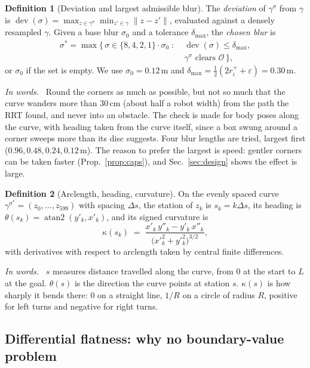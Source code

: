 \documentclass[conference]{IEEEtran}
\theoremstyle{plain}
\theoremstyle{definition}
\newtheorem{definition}{Definition}
\newcommand{\inwords}{\par\smallskip\noindent\textit{In words.}\ }
\newcommand{\Obs}{\mathcal{O}}
\newcommand{\clr}{\varepsilon}
\begin{document}
\begin{definition}[Deviation and largest admissible blur]
\label{def:fitblur}
The \emph{deviation} of $\gamma^{\sigma}$ from $\gamma$ is
$\operatorname{dev}(\sigma) = \max_{z \in \gamma^{\sigma}} \min_{z' \in \gamma}
\lVert z - z'\rVert$, evaluated against a densely resampled $\gamma$. Given a base blur
$\sigma_0$ and a tolerance $\delta_{\max}$, the \emph{chosen blur} is
\begin{equation}
\begin{aligned}
  \sigma^\ast = \max\big\{\, \sigma \in \{8,4,2,1\}\cdot\sigma_0 \;:\;
    &\operatorname{dev}(\sigma) \le \delta_{\max},\\
    &\gamma^{\sigma} \text{ clears } \Obs \,\big\},
\end{aligned}
  \label{eq:fitblur}
\end{equation}
or $\sigma_0$ if the set is empty. We use $\sigma_0 = 0.12$\,m and
$\delta_{\max} = \tfrac12(2r^{+}_i + \clr) = 0.30$\,m.
\inwords
Round the corners as much as possible, but not so much that the curve wanders more than
$30$\,cm (about half a robot width) from the path the RRT found, and never into an obstacle.
The check is made for body poses along the curve, with heading taken from the curve itself,
since a box swung around a corner sweeps more than its disc suggests. Four blur lengths are
tried, largest first ($0.96, 0.48, 0.24, 0.12$\,m). The reason to prefer the largest is
speed: gentler corners can be taken faster (Prop.~\ref{prop:caps}), and
Sec.~\ref{sec:design} shows the effect is large.
\end{definition}

\begin{definition}[Arclength, heading, curvature]
On the evenly spaced curve $\gamma^{\sigma^\ast} = (z_0,\dots,z_{599})$ with spacing
$\Delta s$, the station of $z_k$ is $s_k = k\Delta s$, its heading is
$\theta(s_k) = \operatorname{atan2}(y'_k, x'_k)$, and its signed curvature is
\[
  \kappa(s_k) \;=\; \frac{x'_k\, y''_k - y'_k\, x''_k}{\big(x'^2_k + y'^2_k\big)^{3/2}},
\]
with derivatives with respect to arclength taken by central finite differences.
\inwords
$s$ measures distance travelled along the curve, from $0$ at the start to $L$ at the goal.
$\theta(s)$ is the direction the curve points at station $s$. $\kappa(s)$ is how sharply it
bends there: $0$ on a straight line, $1/R$ on a circle of radius $R$, positive for left
turns and negative for right turns.
\end{definition}

\subsection{Differential flatness: why no boundary-value problem}
\label{sec:prelim-flat}
\end{document}
